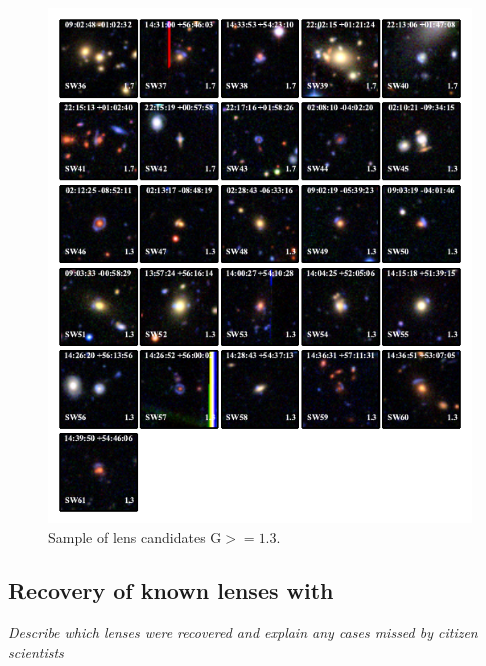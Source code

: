 \documentclass[useAMS,usenatbib,a4paper]{mn2e}
\begin{document}
\begin{figure}
\begin{center}
\includegraphics[scale=1.9]{sw-cfhtls-figs/lenscandfin_1.pdf}
\caption{ \label{fig:lc1}
Sample of lens candidates G$>=1.3$.
}
\end{center}
\end{figure}



\subsection{Recovery of known \cfhtls lenses with \sw}
\label{sec:results:known}

{\it Describe which lenses were recovered and explain any cases missed by
citizen scientists}
\end{document}
